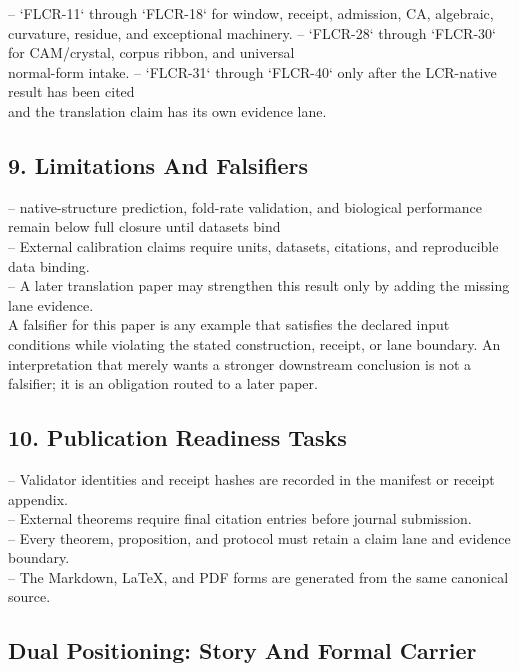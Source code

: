 \documentclass[11pt]{article}
\begin{document}
\noindent{}-- `FLCR-11` through `FLCR-18` for window, receipt, admission, CA, algebraic,\\
  curvature, residue, and exceptional machinery.
\noindent{}-- `FLCR-28` through `FLCR-30` for CAM/crystal, corpus ribbon, and universal\\
  normal-form intake.
\noindent{}-- `FLCR-31` through `FLCR-40` only after the LCR-native result has been cited\\
  and the translation claim has its own evidence lane.

\subsection*{9. Limitations And Falsifiers}

\noindent{}-- native-structure prediction, fold-rate validation, and biological performance remain below full closure until datasets bind\\
\noindent{}-- External calibration claims require units, datasets, citations, and reproducible data binding.\\
\noindent{}-- A later translation paper may strengthen this result only by adding the missing lane evidence.\\

A falsifier for this paper is any example that satisfies the declared input
conditions while violating the stated construction, receipt, or lane boundary.
An interpretation that merely wants a stronger downstream conclusion is not a
falsifier; it is an obligation routed to a later paper.

\subsection*{10. Publication Readiness Tasks}

\noindent{}-- Validator identities and receipt hashes are recorded in the manifest or receipt appendix.\\
\noindent{}-- External theorems require final citation entries before journal submission.\\
\noindent{}-- Every theorem, proposition, and protocol must retain a claim lane and evidence boundary.\\
\noindent{}-- The Markdown, LaTeX, and PDF forms are generated from the same canonical source.\\

\subsection*{Dual Positioning: Story And Formal Carrier}
\end{document}
